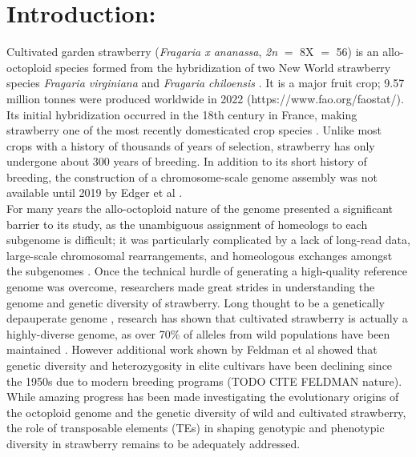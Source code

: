 \documentclass[fleqn,10pt]{olplainarticle}
\begin{document}
\flushbottom
\maketitle
\thispagestyle{empty}

\newpage


\section*{Introduction:}


Cultivated garden strawberry (\textit{Fragaria x ananassa}, \textit{2n} $=$ 8X $=$ 56) is an allo-octoploid species formed from the hybridization of two New World strawberry species \textit{Fragaria virginiana} and \textit{Fragaria chiloensis} \cite{Duschese,Darrow}.
It is a major fruit crop; 9.57 million tonnes were produced worldwide in 2022 (https://www.fao.org/faostat/).
Its initial hybridization occurred in the 18th century in France, making strawberry one of the most recently domesticated crop species \cite{Duschese,Darrow}.
Unlike most crops with a history of thousands of years of selection, strawberry has only undergone about 300 years of breeding.
In addition to its short history of breeding, the construction of a chromosome-scale genome assembly was not available until 2019 by Edger et al \cite{Edger2019}. \\

For many years the allo-octoploid nature of the genome presented a significant barrier to its study, as the unambiguous assignment of homeologs to each subgenome is difficult; it was particularly complicated by a lack of long-read data, large-scale chromosomal rearrangements, and homeologous exchanges amongst the subgenomes \cite{Edger2019}.
Once the technical hurdle of generating a high-quality reference genome was overcome, researchers made great strides in understanding the genome and genetic diversity of strawberry.
Long thought to be a genetically depauperate genome \cite{Hancock1993,Horvath2011}, research has shown that cultivated strawberry is actually a highly-diverse genome, as over 70\% of alleles from wild populations have been maintained \cite{Hardigan2020,Hardigan2021}.
However additional work shown by Feldman et al showed that genetic diversity and heterozygosity in elite cultivars have been declining since the 1950s due to modern breeding programs (TODO CITE FELDMAN nature).
While amazing progress has been made investigating the evolutionary origins of the octoploid genome and the genetic diversity of wild and cultivated strawberry, the role of transposable elements (TEs) in shaping genotypic and phenotypic diversity in strawberry remains to be adequately addressed. \\
\end{document}
